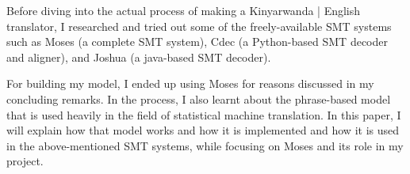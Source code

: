 Before diving into the actual process of making a Kinyarwanda | English translator, I researched and tried out some of the freely-available SMT systems such as Moses (a complete SMT system), Cdec (a Python-based SMT decoder and aligner), and Joshua (a java-based SMT decoder). 

For building my model, I ended up using Moses for reasons discussed in my concluding remarks. In the process, I also learnt about the phrase-based model that is used heavily in the field of statistical machine translation\cite{koehn2003statistical}. In this paper, I will explain how that model works and how it is implemented and how it is used in the above-mentioned SMT systems, while focusing on Moses and its role in my project.